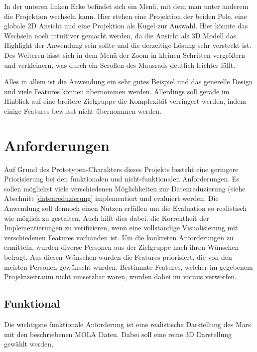 In der unteren linken Ecke befindet sich ein Menü, mit dem man unter anderem die Projektion wechseln kann. Hier stehen eine Projektion der beiden Pole, eine globale 2D Ansicht und eine Projektion als Kugel zur Auswahl. Hier könnte das Wechseln noch intuitiver gemacht werden, da die Ansicht als 3D Modell das Highlight der Anwendung sein sollte und die derzeitige Lösung sehr versteckt ist. Des Weiteren lässt sich in dem Menü der Zoom in kleinen Schritten vergrößern und verkleinern, was durch ein Scrollen des Mausrads deutlich leichter fällt.



Alles in allem ist die Anwendung ein sehr gutes Beispiel und das generelle Design und viele Features können übernommen werden. Allerdings soll gerade im Hinblick auf eine breitere Zielgruppe die Komplexität verringert werden, indem einige Features bewusst nicht übernommen werden.




\section{Anforderungen}
Auf Grund des Prototypen-Charakters dieses Projekts besteht eine geringere Priorisierung bei den funktionalen und nicht-funktionalen Anforderungen. Es sollen möglichst viele verschiedenen Möglichkeiten zur Datenreduzierung (siehe Abschnitt \ref{datenreduzierung} implementiert und evaluiert werden. Die Anwendung soll dennoch einen Nutzen erfüllen um die Evaluation so realistisch wie möglich zu gestalten. Auch hilft dies dabei, die Korrektheit der Implementierungen zu verifizieren, wenn eine vollständige Visualisierung mit verschiedenen Features vorhanden ist. Um die konkreten Anforderungen zu ermitteln, wurden diverse Personen aus der Zielgruppe nach ihren Wünschen befragt. Aus diesen Wünschen wurden die Features priorisiert, die von den meisten Personen gewünscht wurden. Bestimmte Features, welcher im gegebenem Projektzeitraum nicht umsetzbar waren, wurden dabei im voraus verworfen. 


\subsection{Funktional}
Die wichtigste funktionale Anforderung ist eine realistische Darstellung des Mars mit den beschriebenen MOLA Daten. Dabei soll eine reine 3D Darstellung gewählt werden, 


